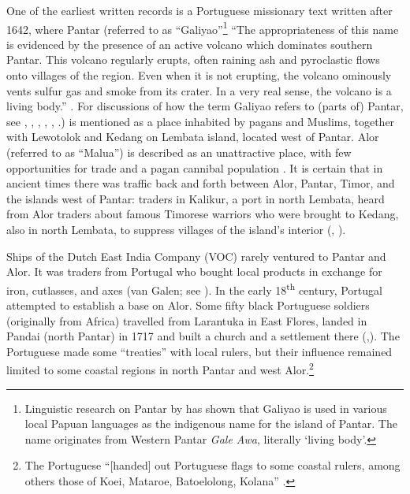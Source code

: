 One of the earliest written records is a Portuguese missionary text written after 1642, where Pantar (referred to as ``Galiyao''\footnote{Linguistic research on Pantar by \citet{Holton2010galiyao} has shown that Galiyao is used in various local Papuan languages as the indigenous name for the island of Pantar. The name originates from Western Pantar \textit{Gale Awa}, literally `living body'.} 
 { ``}{The appropriateness of this name is evidenced by the presence of an active volcano which dominates southern Pantar. This volcano regularly erupts, often raining ash and pyroclastic flows onto villages of the region. Even when it is not erupting, the volcano ominously vents sulfur gas and smoke from its crater. In a very real sense, the volcano is a living body.'' \citep{Holton2010galiyao}.} 
{For discussions of how the term Galiyao refers to (parts of) Pantar, see \citet[47]{LeRoux1929}, \citet[407]{Barnes1982majapahit}, \citet{Dietrich1984}, \citet{Rodemeier1995}, \citet[277]{Barnes2001}, \citet{Rodemeier2006}.}) is mentioned as a place inhabited by pagans and Muslims, together with Lewotolok and Kedang on Lembata island, located west of Pantar. Alor (referred to as ``Malua'') is described as an unattractive place, with few opportunities for trade and a pagan cannibal population \citep[101]{Hagerdal2012}. It is certain that in ancient times there was traffic back and forth between Alor, Pantar, Timor, and the islands west of Pantar: traders in Kalikur, a port in north Lembata, heard from Alor traders about famous Timorese warriors who were brought to Kedang, also in north Lembata, to suppress villages of the island's interior (\citealt[10.12]{Barnes1974}, \citealt[14]{LeRoux1929}). 

Ships of the Dutch East India Company (VOC) rarely ventured to Pantar and Alor. It was traders from Portugal who bought local products in exchange for iron, cutlasses, and axes (van Galen; see \citealt[17]{Hagerdal2010galens1}). In the early 18\textsuperscript{th} century, Portugal attempted to establish a base on Alor. Some fifty black Portuguese soldiers (originally from Africa) travelled from Larantuka in East Flores, landed in Pandai (north Pantar) in 1717 and built a church and a settlement there (\citealt[297]{Coolhaas1979},\citealt[78]{Rodemeier2006}). The Portuguese made some ``treaties'' with local rulers, but their influence remained limited to some coastal regions in north Pantar and west Alor.\footnote{The Portuguese ``[handed] out Portuguese flags to some coastal rulers, among others those of Koei, Mataroe, Batoelolong, Kolana'' \citep[2]{VanGaalen1945}.} 

